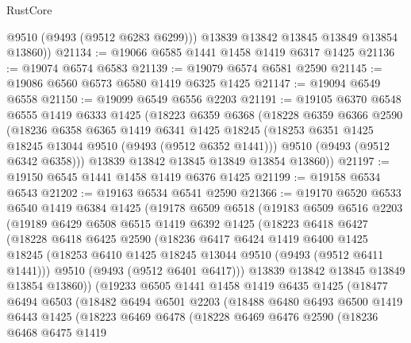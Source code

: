 \begin{lexlean}{RustCore}
\begin{coremodule}
          @9510
          (@9493 (@9512 @6283 @6299)))
        @13839
        @13842
        @13845
        @13849
        @13854
        @13860))
@21134 := @19066 @6585 @1441 @1458 @1419 @6317 @1425
@21136 := @19074 @6574 @6583
@21139 := @19079 @6574 @6581 @2590
@21145 := @19086 @6560 @6573 @6580 @1419 @6325 @1425
@21147 := @19094 @6549 @6558
@21150 := @19099 @6549 @6556 @2203
@21191 := @19105
    @6370
    @6548
    @6555
    @1419
    @6333
    @1425
    (@18223
      @6359
      @6368
      (@18228
        @6359
        @6366
        @2590
        (@18236
          @6358
          @6365
          @1419
          @6341
          @1425
          @18245
          (@18253 @6351 @1425 @18245 @13044 @9510 (@9493 (@9512 @6352 @1441)))
          @9510
          (@9493 (@9512 @6342 @6358)))
        @13839
        @13842
        @13845
        @13849
        @13854
        @13860))
@21197 := @19150 @6545 @1441 @1458 @1419 @6376 @1425
@21199 := @19158 @6534 @6543
@21202 := @19163 @6534 @6541 @2590
@21366 := @19170
    @6520
    @6533
    @6540
    @1419
    @6384
    @1425
    (@19178
      @6509
      @6518
      (@19183
        @6509
        @6516
        @2203
        (@19189
          @6429
          @6508
          @6515
          @1419
          @6392
          @1425
          (@18223
            @6418
            @6427
            (@18228
              @6418
              @6425
              @2590
              (@18236
                @6417
                @6424
                @1419
                @6400
                @1425
                @18245
                (@18253 @6410 @1425 @18245 @13044 @9510 (@9493 (@9512 @6411 @1441)))
                @9510
                (@9493 (@9512 @6401 @6417)))
              @13839
              @13842
              @13845
              @13849
              @13854
              @13860))
          (@19233
            @6505
            @1441
            @1458
            @1419
            @6435
            @1425
            (@18477
              @6494
              @6503
              (@18482
                @6494
                @6501
                @2203
                (@18488
                  @6480
                  @6493
                  @6500
                  @1419
                  @6443
                  @1425
                  (@18223
                    @6469
                    @6478
                    (@18228
                      @6469
                      @6476
                      @2590
                      (@18236
                        @6468
                        @6475
                        @1419

\end{coremodule}
\end{lexlean}
